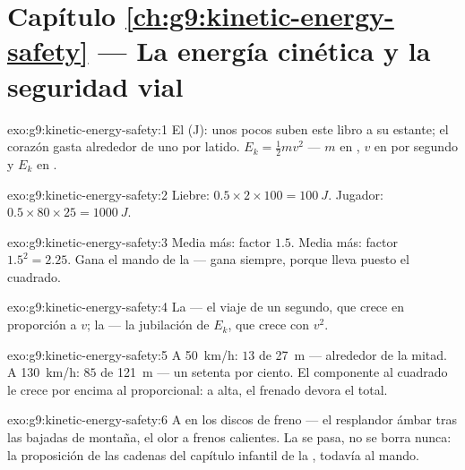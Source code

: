 \section*{Capítulo \ref{ch:g9:kinetic-energy-safety} --- La energía cinética y la seguridad vial}

\begin{solution}{exo:g9:kinetic-energy-safety:1}
El  (\unit{J}): unos pocos  suben este libro a
su estante; el corazón gasta alrededor de uno por latido. $E_k =
\frac12 m v^2$ --- $m$ en , $v$ en  por
segundo y $E_k$ en .
\end{solution}

\begin{solution}{exo:g9:kinetic-energy-safety:2}
Liebre: $0.5 \times 2 \times 100 = \qty{100}{J}$. Jugador: $0.5 \times
80 \times 25 = \qty{1000}{J}$.
\end{solution}

\begin{solution}{exo:g9:kinetic-energy-safety:3}
Media  más: factor $1.5$. Media  más: factor
$1.5^2 = 2.25$. Gana el mando de la  --- gana siempre,
porque lleva puesto el cuadrado.
\end{solution}

\begin{solution}{exo:g9:kinetic-energy-safety:4}
La  --- el viaje de un segundo, que crece en
proporción a $v$; la  --- la jubilación de
$E_k$, que crece con $v^2$.
\end{solution}

\begin{solution}{exo:g9:kinetic-energy-safety:5}
A \qty{50}{km/h}: $13$ de \qty{27}{m} --- alrededor de la mitad. A
\qty{130}{km/h}: $85$ de \qty{121}{m} --- un setenta por ciento. El
componente al cuadrado le crece por encima al proporcional: a
 alta, el frenado devora el total.
\end{solution}

\begin{solution}{exo:g9:kinetic-energy-safety:6}
A  en los discos de freno --- el resplandor ámbar tras las
bajadas de montaña, el olor a frenos calientes. La
 se pasa, no se borra nunca: la proposición de las cadenas
del capítulo infantil de la , todavía al mando.
\end{solution}

